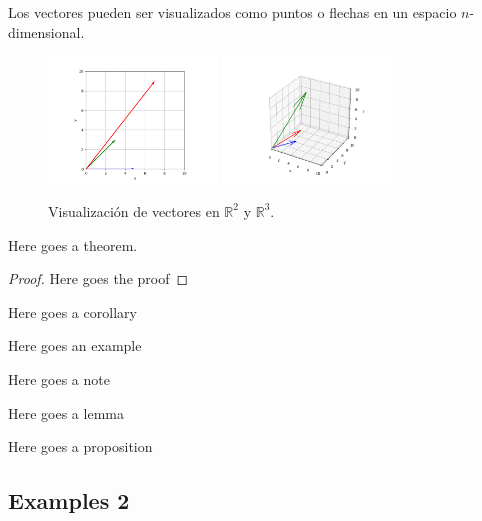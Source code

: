 Los vectores pueden ser visualizados como puntos o flechas en un espacio $n$-dimensional.

\begin{figure}[htbp]
    \centering
    \includegraphics[width=0.4\textwidth]{Images/1/vectors.png}
    \hspace{2cm} 
    \includegraphics[width=0.4\textwidth]{Images/1/vectors_3d.png}
    \caption{Visualización de vectores en $\mathbb{R}^2$ y $\mathbb{R}^3$.}
    \label{fig:imagenes}
\end{figure}

\lipsum[1]

\begin{theorem}
    Here goes a theorem.
    \lipsum[1]
\end{theorem}

\begin{proof}
        Here goes the proof

    \lipsum[2]
\end{proof}


\begin{corollary}
    Here goes a corollary
\end{corollary}

\begin{eg}
    Here goes an example
\end{eg}

\begin{note}
    Here goes a note 

    \lipsum[2]
\end{note}


\begin{lemma}
    Here goes a lemma
\end{lemma}

\begin{prop}
    Here goes a proposition
\end{prop}

\subsection{Examples 2}
